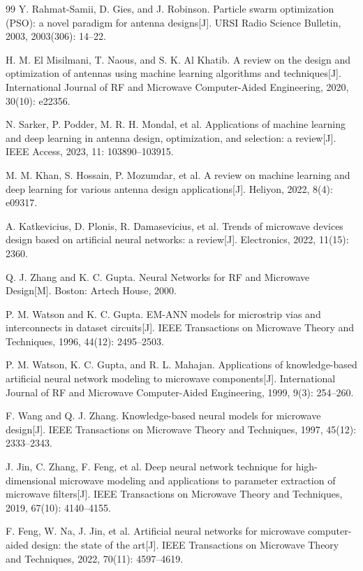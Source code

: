 \documentclass[UTF8,a4paper,12pt]{ctexart}
\begin{document}
\begin{thebibliography}{99}
 Y. Rahmat-Samii, D. Gies, and J. Robinson. Particle swarm optimization (PSO): a novel paradigm for antenna designs[J]. URSI Radio Science Bulletin, 2003, 2003(306): 14--22.

 H. M. El Misilmani, T. Naous, and S. K. Al Khatib. A review on the design and optimization of antennas using machine learning algorithms and techniques[J]. International Journal of RF and Microwave Computer-Aided Engineering, 2020, 30(10): e22356.

 N. Sarker, P. Podder, M. R. H. Mondal, et al. Applications of machine learning and deep learning in antenna design, optimization, and selection: a review[J]. IEEE Access, 2023, 11: 103890--103915.

 M. M. Khan, S. Hossain, P. Mozumdar, et al. A review on machine learning and deep learning for various antenna design applications[J]. Heliyon, 2022, 8(4): e09317.

 A. Katkevicius, D. Plonis, R. Damasevicius, et al. Trends of microwave devices design based on artificial neural networks: a review[J]. Electronics, 2022, 11(15): 2360.

 Q. J. Zhang and K. C. Gupta. Neural Networks for RF and Microwave Design[M]. Boston: Artech House, 2000.

 P. M. Watson and K. C. Gupta. EM-ANN models for microstrip vias and interconnects in dataset circuits[J]. IEEE Transactions on Microwave Theory and Techniques, 1996, 44(12): 2495--2503.

 P. M. Watson, K. C. Gupta, and R. L. Mahajan. Applications of knowledge-based artificial neural network modeling to microwave components[J]. International Journal of RF and Microwave Computer-Aided Engineering, 1999, 9(3): 254--260.

 F. Wang and Q. J. Zhang. Knowledge-based neural models for microwave design[J]. IEEE Transactions on Microwave Theory and Techniques, 1997, 45(12): 2333--2343.

 J. Jin, C. Zhang, F. Feng, et al. Deep neural network technique for high-dimensional microwave modeling and applications to parameter extraction of microwave filters[J]. IEEE Transactions on Microwave Theory and Techniques, 2019, 67(10): 4140--4155.

 F. Feng, W. Na, J. Jin, et al. Artificial neural networks for microwave computer-aided design: the state of the art[J]. IEEE Transactions on Microwave Theory and Techniques, 2022, 70(11): 4597--4619.


\end{thebibliography}
\end{document}
